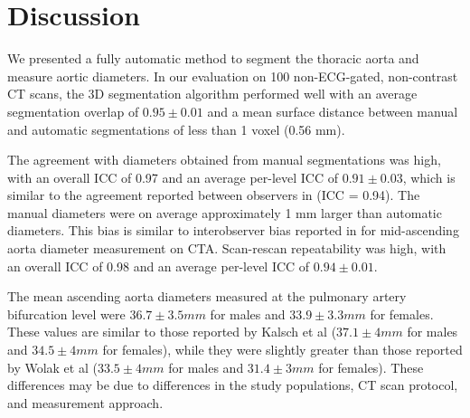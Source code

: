\section{Discussion}

We presented a fully automatic method to segment the thoracic aorta and measure aortic diameters. In our evaluation on 100 non-ECG-gated, non-contrast CT scans, the 3D segmentation algorithm performed well with an average segmentation overlap of $0.95 \pm 0.01$ and a mean surface distance between manual and automatic segmentations of less than 1 voxel (0.56 mm).


The agreement with diameters obtained from manual segmentations was high, with an overall ICC of 0.97 and an average per-level ICC of $0.91 \pm 0.03$, which is similar to the agreement reported between observers in \autocite{terzikhan2017pulmonary} (ICC = 0.94). The manual diameters were on average approximately 1 mm larger than automatic diameters. This bias is similar to interobserver bias reported in \autocite{quint2013proximal} for mid-ascending aorta diameter measurement on CTA. Scan-rescan repeatability was high, with an overall ICC of 0.98 and an average per-level ICC of $0.94 \pm 0.01$.


The mean ascending aorta diameters measured at the pulmonary artery bifurcation level were $36.7 \pm 3.5 mm$ for males and $33.9 \pm 3.3 mm$ for females. These values are similar to those reported by Kalsch et al \autocite{kalsch2013body} ($37.1 \pm 4 mm$ for males and $34.5 \pm 4 mm$ for females), while they were slightly greater than those reported by Wolak et al \autocite{wolak2008aortic} ($33.5 \pm 4 mm$ for males and $31.4 \pm 3 mm$ for females). These differences may be due to differences in the study populations, CT scan protocol, and measurement approach.


